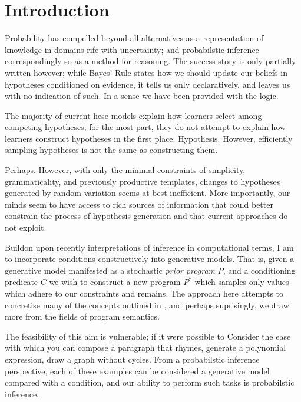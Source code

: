 
\chapter{Introduction} %

\label{ch:examples} %


Probability has compelled beyond all alternatives as a representation of knowledge in domains rife with uncertainty; and probabilstic inference correspondingly so as a method for reasoning.
The success story is only partially written however; while Bayes' Rule states how we should update our beliefs in hypotheses conditioned on evidence, it tells us only declaratively, and leaves us with no indication of such.
In a sense we have been provided with the logic.

The majority of current 
hese models explain how learners select among competing
hypotheses; for the most part, they do not attempt to explain how learners construct
hypotheses in the first place.
Hypothesis. However, efficiently sampling
hypotheses is not the same as constructing them.

Perhaps.
However, with only the minimal constraints of simplicity,
grammaticality, and previously productive templates, changes to hypotheses generated by
random variation seems at best inefficient. More importantly, our minds seem to have
access to rich sources of information that could better constrain the process of hypothesis generation and that current approaches do not exploit.

Buildon upon recently interpretations of inference in computational terms, I am to incorporate conditions constructively into generative models.
That is, given a generative model manifested as a stochastic {\em prior program} $P$, and a conditioning predicate $C$ we wish to construct a new program $P^*$ which samples only values which adhere to our constraints and remains.
The approach here attempts to concretise many of the concepts outlined in \citep{SHULTZ}
, and perhaps suprisingly, we draw more from the fields of program semantics.

The feasibility of this aim is vulnerable; if it were possible to
Consider the ease with which you can compose a paragraph that rhymes, generate a polynomial expression, draw a graph without cycles.
From a probabilstic inference perspective, each of these examples can be considered a generative model compared with a condition, and our ability to perform such tasks is probabilstic inference.

